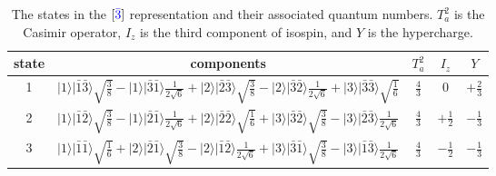 \documentclass[11pt]{article}
\begin{document}
\begin{table}
\center
\caption{The states in the $[{\color{blue}\bar{3}}]$ representation and their associated quantum numbers.  $T^2_a$ is the Casimir operator, $I_z$ is the third component of isospin, and $Y$ is the hypercharge.\label{tab:3b}}
\begin{tabular}{c|c|c|c|c}
state&components & $T_a^2$ & $I_z$ & $Y$\\
\hline\hline
1&$|1\rangle|\bar{1}\bar{3}\rangle\sqrt{\frac{3}{8}}-|1\rangle|\bar{3}\bar{1}\rangle\frac{1}{2\sqrt{6}}+|2\rangle|\bar{2}\bar{3}\rangle\sqrt{\frac{3}{8}}-|2\rangle|\bar{3}\bar{2}\rangle\frac{1}{2\sqrt{6}}+|3\rangle|\bar{3}\bar{3}\rangle\sqrt{\frac{1}{6}}$ &$\frac{4}{3}$ &0 & $+\frac{2}{3}$\\
\hline
2& $|1\rangle|\bar{1}\bar{2}\rangle\sqrt{\frac{3}{8}}-|1\rangle|\bar{2}\bar{1}\rangle\frac{1}{2\sqrt{6}}+|2\rangle|\bar{2}\bar{2}\rangle\sqrt{\frac{1}{6}}+|3\rangle|\bar{3}\bar{2}\rangle\sqrt{\frac{3}{8}}-|3\rangle|\bar{2}\bar{3}\rangle\frac{1}{2\sqrt{6}}$ &$\frac{4}{3}$ &$+\frac{1}{2}$ & $-\frac{1}{3}$\\
3& $|1\rangle|\bar{1}\bar{1}\rangle\sqrt{\frac{1}{6}}+|2\rangle|\bar{2}\bar{1}\rangle\sqrt{\frac{3}{8}}-|2\rangle|\bar{1}\bar{2}\rangle\frac{1}{2\sqrt{6}}+|3\rangle|\bar{3}\bar{1}\rangle\sqrt{\frac{3}{8}}-|3\rangle|\bar{1}\bar{3}\rangle\frac{1}{2\sqrt{6}}$ &$\frac{4}{3}$ &$-\frac{1}{2}$ & $-\frac{1}{3}$\\
\hline\hline
\end{tabular}
\end{table}
\end{document}
